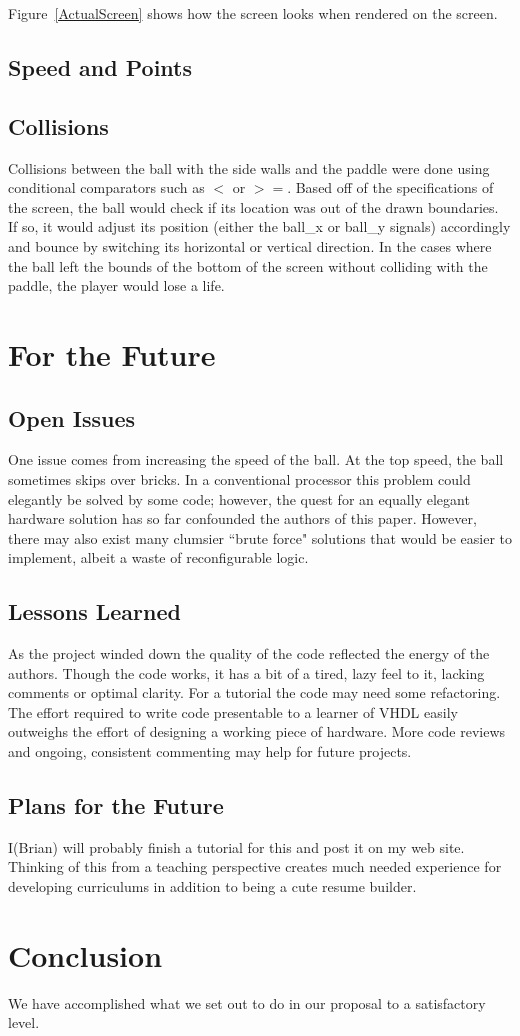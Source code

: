 \documentclass[conference]{IEEEtran}
\begin{document}
Figure~\ref{ActualScreen} shows how the screen looks when rendered on the screen.


\subsection{Speed and Points}


\subsection{Collisions}
Collisions between the ball with the side walls and the paddle were done using conditional comparators such as $<$ or $>=$. Based off of the specifications of the screen, the ball would check if its location was out of the drawn boundaries. If so, it would adjust its position (either the ball\_x or ball\_y signals) accordingly and bounce by switching its horizontal or vertical direction. In the cases where the ball left the bounds of the bottom of the screen without colliding with the paddle, the player would lose a life.


\section{For the Future}
\subsection{Open Issues}
One issue comes from increasing the speed of the ball. At the top speed, the ball sometimes skips over bricks. In a conventional processor this problem could elegantly be solved by some code; however, the quest for an equally elegant hardware solution has so far confounded the authors of this paper. However, there may also exist many clumsier ``brute force" solutions that would be easier to implement, albeit a waste of reconfigurable logic.
\subsection{Lessons Learned}
As the project winded down the quality of the code reflected the energy of the authors. Though the code works, it has a bit of a tired, lazy feel to it, lacking comments or optimal clarity. For a tutorial the code may need some refactoring. The effort required to write code presentable to a learner of VHDL easily outweighs the effort of designing a working piece of hardware. More code reviews and ongoing, consistent commenting may help for future projects.
\subsection{Plans for the Future}
I(Brian) will probably finish a tutorial for this and post it on my web site. Thinking of this from a teaching perspective creates much needed experience for developing curriculums in addition to being a cute resume builder.
\section{Conclusion}
We have accomplished what we set out to do in our proposal to a satisfactory level.
\end{document}
